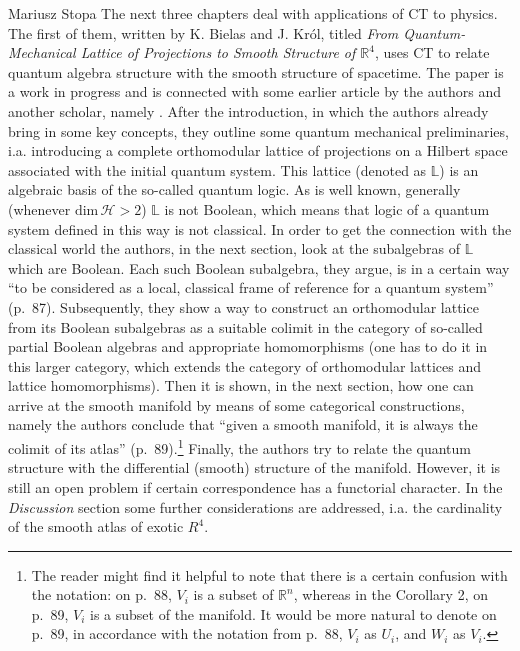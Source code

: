 \begin{recengenv}{Mariusz Stopa}
\enlargethispage{-.5\baselineskip}
The next three chapters deal with applications of CT to physics. The first of them, written by K. Bielas and J. Król, titled \textit{From Quantum-Mechanical Lattice of Projections to Smooth Structure of $ \mathbb{R}^4 $}, uses CT to relate quantum algebra structure with the smooth structure of spacetime. The paper is a work in progress and is connected with some earlier article by the authors and another scholar, namely \textcite{krol-2017}. After the introduction, in which the authors already bring in some key concepts, they outline some quantum mechanical preliminaries, i.a. introducing a complete orthomodular lattice of projections on a Hilbert space associated with the initial quantum system. This lattice (denoted as $ \mathbb{L} $) is an algebraic basis of the so-called quantum logic. As is well known, generally (whenever $\text{dim}\,\mathscr{H}>2$) $ \mathbb{L} $ is not Boolean, which means that logic of a quantum system defined in this way is not classical. In order to get the connection with the classical world the authors, in the next section, look at the subalgebras of $ \mathbb{L} $ which are Boolean. Each such Boolean subalgebra, they argue, is in a certain way ``to be considered as a local, classical frame of reference for a quantum system'' (p.~87). Subsequently, they show a way to construct an orthomodular lattice from its Boolean subalgebras as a suitable colimit in the cat\-e\-go\-ry of so-called partial Boolean algebras and appropriate homomorphisms (one has to do it in this larger cat\-e\-go\-ry, which extends the cat\-e\-go\-ry of orthomodular lattices and lattice homomorphisms). Then it is shown, in the next section, how one can arrive at the smooth manifold by means of some cat\-e\-gor\-i\-cal constructions, namely the authors conclude that ``given a smooth manifold, it is always the colimit of its atlas'' (p.~89).\footnote{The reader might find it helpful to note that there is a certain confusion with the notation: on p.~88, $ V_i $ is a subset of $ \mathbb{R}^n $, whereas in the Corollary 2, on p.~89, $ V_i $ is a subset of the manifold. It would be more natural to denote on p.~89, in accordance with the notation from p.~88, $ V_i $ as $ U_i $, and $ W_i $ as $ V_i $.} Finally, the authors try to relate the quantum structure with the differential (smooth) structure of the manifold. However, it is still an open problem if certain correspondence has a functorial character. In the \textit{Discussion} section some further considerations are addressed, i.a. the cardinality of the smooth atlas of exotic $ R^4 $. 



\end{recengenv}
